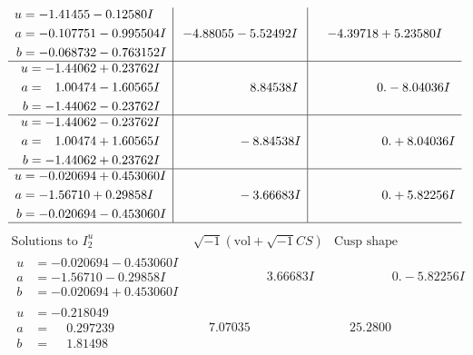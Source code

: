 \documentclass[1p]{elsarticle_modified}
\theoremstyle{definition}
\newcommand{\I}{\sqrt{-1}}
\begin{document}
$$\begin{array}{c|c|c}
\begin{aligned}
u &= -1.41455 - 0.12580 I \\
a &= -0.107751 - 0.995504 I \\
b &= -0.068732 - 0.763152 I\end{aligned}
 & -4.88055 - 5.52492 I & -4.39718 + 5.23580 I \\ \hline\begin{aligned}
u &= -1.44062 + 0.23762 I \\
a &= \phantom{-}1.00474 - 1.60565 I \\
b &= -1.44062 - 0.23762 I\end{aligned}
 & \phantom{-0.000000 -}8.84538 I & \phantom{-0.000000 } 0. - 8.04036 I \\ \hline\begin{aligned}
u &= -1.44062 - 0.23762 I \\
a &= \phantom{-}1.00474 + 1.60565 I \\
b &= -1.44062 + 0.23762 I\end{aligned}
 & \phantom{-0.000000 } -8.84538 I & \phantom{-0.000000 -}0. + 8.04036 I \\ \hline\begin{aligned}
u &= -0.020694 + 0.453060 I \\
a &= -1.56710 + 0.29858 I \\
b &= -0.020694 - 0.453060 I\end{aligned}
 & \phantom{-0.000000 } -3.66683 I & \phantom{-0.000000 -}0. + 5.82256 I\\
 \hline 
 \end{array}$$\newpage$$\begin{array}{c|c|c}  
\text{Solutions to }I^u_{2}& \I (\text{vol} + \sqrt{-1}CS) & \text{Cusp shape}\\
 \hline 
\begin{aligned}
u &= -0.020694 - 0.453060 I \\
a &= -1.56710 - 0.29858 I \\
b &= -0.020694 + 0.453060 I\end{aligned}
 & \phantom{-0.000000 -}3.66683 I & \phantom{-0.000000 } 0. - 5.82256 I \\ \hline\begin{aligned}
u &= -0.218049\phantom{ +0.000000I} \\
a &= \phantom{-}0.297239\phantom{ +0.000000I} \\
b &= \phantom{-}1.81498\phantom{ +0.000000I}\end{aligned}
 & \phantom{-}7.07035\phantom{ +0.000000I} & \phantom{-}25.2800\phantom{ +0.000000I} \\ \hline\begin{aligned}

\end{aligned}
\end{array}$$
\end{document}
